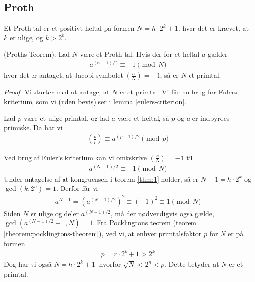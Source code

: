 \subsection{Proth}
Et Proth tal er et positivt heltal på formen $N = h \cdot 2^k + 1$, hvor det er krævet, at $k$ er ulige, og $k > 2^h$.
\begin{theorem}
\label{thm:1}
(Proths Teorem). Lad $N$ være et Proth tal. Hvis der for et heltal $a$ gælder
\begin{align*}
  a^{(n-1)/2} \equiv -1 \pmod{N}
\end{align*}
hvor det er antaget, at Jacobi symbolet $(\frac{a}{N}) = -1$, så er $N$ et primtal.
\end{theorem}
\begin{proof}
Vi starter med at antage, at $N$ er et primtal. Vi får nu brug for Eulers kriterium, som vi (uden bevis)
ser i lemma \ref{eulers-criterion}.
\begin{lemma}
Lad $p$ være et ulige primtal, og lad $a$ være et heltal, så $p$ og $a$ er indbyrdes primiske. Da har vi
\begin{align*}
  \left( \frac{a}{p} \right) \equiv a^{(p-1)/2} \pmod{p}
\end{align*}
\label{eulers-criterion}
\end{lemma}
Ved brug af Euler's kriterium kan vi omkskrive $(\frac{a}{N}) = -1$  til
\begin{align*}
  a^{(N-1)/2} \equiv -1 \pmod{N}
\end{align*}
Under antagelse af at kongruensen i teorem \ref{thm:1} holder, så er $N-1 = h \cdot 2^k$ og $\gcd(k, 2^n) = 1$. Derfor får vi
\begin{align*}
  a^{N-1} = \left( a^{(N-1)/2} \right)^2 \equiv (-1)^2 \equiv 1 \pmod{N}
\end{align*}
Siden $N$ er ulige og deler $a^{(N-1)/2}$, må der nødvendigvis også gælde, $\gcd(a^{(N-1)/2}-1,N)=1$.
Fra Pocklingtons teorem (teorem \ref{theorem:pocklingtons-theorem}), ved vi, at enhver primtalsfaktor $p$ for $N$ er på formen
\begin{align*}
  p =r \cdot 2^k + 1 > 2^k
\end{align*}
Dog har vi også $N = h \cdot 2^k+1$, hvorfor $\sqrt{N} < 2^n < p$. Dette betyder at $N$ er et primtal.
\end{proof}
